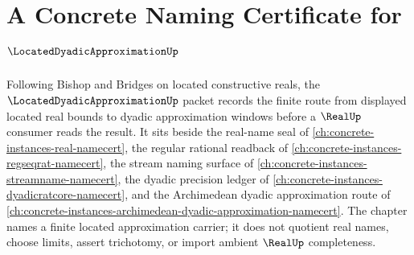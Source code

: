 \chapter{A Concrete Naming Certificate for $\LocatedDyadicApproximationUp$}
\label{ch:concrete-instances-located-dyadic-approximation-namecert}

Following Bishop and Bridges on located constructive reals, the $\LocatedDyadicApproximationUp$ packet records the finite route from displayed located real bounds to dyadic approximation windows before a $\RealUp$ consumer reads the result. It sits beside the real-name seal of \autoref{ch:concrete-instances-real-namecert}, the regular rational readback of \autoref{ch:concrete-instances-regseqrat-namecert}, the stream naming surface of \autoref{ch:concrete-instances-streamname-namecert}, the dyadic precision ledger of \autoref{ch:concrete-instances-dyadicratcore-namecert}, and the Archimedean dyadic approximation route of \autoref{ch:concrete-instances-archimedean-dyadic-approximation-namecert}. The chapter names a finite located approximation carrier; it does not quotient real names, choose limits, assert trichotomy, or import ambient $\RealUp$ completeness.

